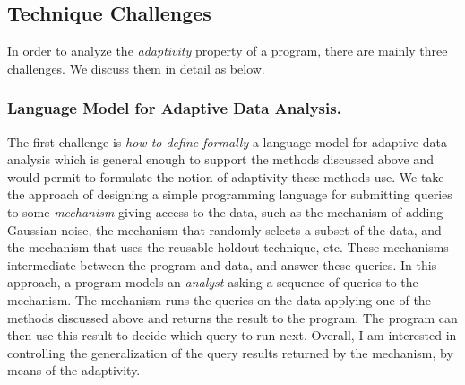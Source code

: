 \subsection{Technique Challenges}
\label{sec:adapt-intro-challenge}
In order to analyze the \emph{adaptivity} property of a program, there are mainly three challenges.
We discuss them in detail as below.


\subsubsection{Language Model for Adaptive Data Analysis.}
The first challenge is \emph{how to define formally} a language model for adaptive data analysis which is general enough to support the methods discussed above and would permit to formulate the notion of adaptivity these methods use. 
We take the approach of designing a simple programming language for submitting queries to some \emph{mechanism} giving access 
to the data, such as
the mechanism of adding Gaussian noise, 
the mechanism that randomly selects a subset of the data, 
and the mechanism that uses the reusable holdout technique, etc. 
These mechanisms intermediate between the program and data, and answer these queries.
In this approach, a program models an \emph{analyst} asking a sequence of queries to the mechanism. 
The mechanism runs the queries on the data applying one of the methods discussed above and returns the result to the program. The program can then use this result to decide which query to run next. 
Overall, I am interested in controlling the generalization of the query results returned by the mechanism, by means of the adaptivity. 

